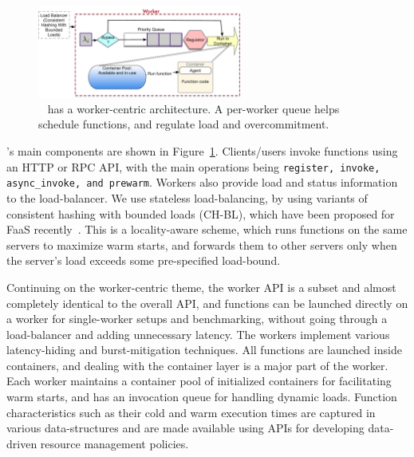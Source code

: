 \begin{figure}
  \centering 
  \includegraphics[width=0.6\textwidth]{iluvatar/figs/il76-q.pdf}
  \caption{\sysname~ has a worker-centric architecture. A per-worker queue helps schedule functions, and regulate load and overcommitment. }
  \label{fig:arch}
\end{figure}

\sysname's main components are shown in Figure~\ref{fig:arch}.
Clients/users invoke functions using an HTTP or RPC API, with the main operations being \texttt{register, invoke, async\_invoke, and prewarm}.
Workers also provide load and status information to the load-balancer. 
We use stateless load-balancing, by using variants of consistent hashing with bounded loads (CH-BL), which have been proposed for FaaS recently~\cite{faaslb-hpdc22}. 
This is a locality-aware scheme, which runs functions on the same servers to maximize warm starts, and forwards them to other servers only when the server's load exceeds some pre-specified load-bound.


Continuing on the worker-centric theme, the worker API is a subset and almost completely identical to the overall API, and functions can be launched directly on a worker for single-worker setups and benchmarking, without going through a load-balancer and adding unnecessary latency.
The workers implement various latency-hiding and burst-mitigation techniques. 
All functions are launched inside containers, and dealing with the container layer is a major part of the worker. 
Each worker maintains a container pool of initialized containers for facilitating warm starts, and has an invocation queue for handling dynamic loads.
Function characteristics such as their cold and warm execution times are captured in various data-structures and are made available using APIs for developing data-driven resource management policies.

